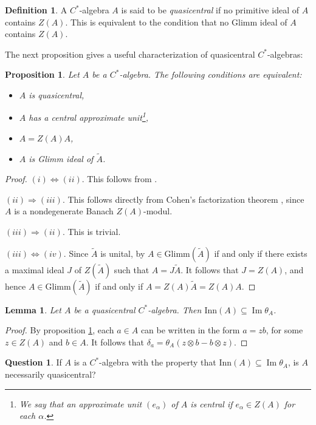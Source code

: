 \documentclass[]{amsart}
\newtheorem{lemma}[theorem]{Lemma}
\newtheorem{proposition}[theorem]{Proposition}
\theoremstyle{remark}
\theoremstyle{definition}
\newtheorem{definition}[theorem]{Definition}
\theoremstyle{question}
\newtheorem{question}[theorem]{Question}
\numberwithin{equation}{section}
\begin{document}
\begin{definition}
A $C^*$-algebra $A$ is said to be \textit{quasicentral} if no primitive ideal of
$A$ contains $Z(A)$. This is equivalent to the condition that no Glimm ideal of $A$ contains $Z(A)$.
\end{definition}
 The next proposition gives a useful characterization of quasicentral $C^*$-algebras:
\begin{proposition}\label{qc} Let $A$ be a $C^*$-algebra. The following
conditions are equivalent:
\begin{itemize}
\item[(i)] $A$ is quasicentral,
\item[(ii)] $A$ has a central approximate unit\footnote{We say that an approximate unit $(e_\alpha)$ of $A$ is central if $e_\alpha \in Z(A)$ for each $\alpha$.},
\item[(iii)] $A=Z(A)A$,
\item[(iv)] $A$ is Glimm ideal of $\tilde{A}$.
\end{itemize}
\end{proposition}
\begin{proof}
$(i) \Leftrightarrow (ii)$. This follows from \cite[Thm. 1]{Arc1}.

$(ii)\Rightarrow (iii).$ This follows directly from Cohen's factorization
theorem \cite[A.6.2]{Ble}, since $A$ is a nondegenerate Banach
$Z(A)$-modul.

$(iii)\Rightarrow (ii).$ This is trivial.

$(iii)\Leftrightarrow (iv).$ Since $\tilde{A}$ is unital, by \cite{ArcSom1} $A \in \mathrm{Glimm}(\tilde{A})$ if and only if there exists a maximal ideal $J$ of $Z(\tilde{A})$
such that $A=J\tilde{A}$. It follows that $J=Z(A)$, and hence $A\in \mathrm{Glimm}(\tilde{A})$ if and only if $A=Z(A)\tilde{A}=Z(A)A$.
\end{proof}

\begin{lemma}\label{triv} Let $A$ be a quasicentral $C^*$-algebra. Then $\mathrm{Inn}(A) \subseteq {\mathop{\mathrm{Im}}} \theta_A$.
\end{lemma}
\begin{proof} By proposition \ref{qc}, each $a \in A$ can be written in the form $a=zb$, for some $z \in Z(A)$ and $b \in A$. It follows that $\delta_a=\theta_A(z\otimes b-b \otimes z)$.
\end{proof}
\begin{question} If $A$ is a $C^*$-algebra with the property that $\mathrm{Inn}(A) \subseteq {\mathop{\mathrm{Im}}} \theta_A$, is $A$ necessarily quasicentral?
\end{question}
\end{document}

